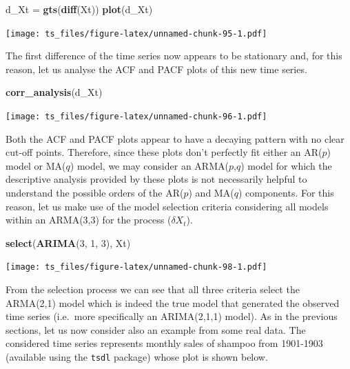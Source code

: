 \documentclass[]{book}
\newenvironment{Shaded}{\begin{snugshade}}{\end{snugshade}}
\newcommand{\KeywordTok}[1]{\textcolor[rgb]{0.13,0.29,0.53}{\textbf{#1}}}
\newcommand{\DecValTok}[1]{\textcolor[rgb]{0.00,0.00,0.81}{#1}}
\newcommand{\StringTok}[1]{\textcolor[rgb]{0.31,0.60,0.02}{#1}}
\newcommand{\NormalTok}[1]{#1}
\theoremstyle{definition}
\theoremstyle{definition}
\theoremstyle{definition}
\theoremstyle{remark}
\begin{document}
\begin{Shaded}
\begin{Highlighting}[]
\NormalTok{d_Xt =}\StringTok{ }\KeywordTok{gts}\NormalTok{(}\KeywordTok{diff}\NormalTok{(Xt))}
\KeywordTok{plot}\NormalTok{(d_Xt)}
\end{Highlighting}
\end{Shaded}

\texttt{[image: ts\_files/figure-latex/unnamed-chunk-95-1.pdf]}

The first difference of the time series now appears to be stationary
and, for this reason, let us analyse the ACF and PACF plots of this new
time series.

\begin{Shaded}
\begin{Highlighting}[]
\KeywordTok{corr_analysis}\NormalTok{(d_Xt)}
\end{Highlighting}
\end{Shaded}

\texttt{[image: ts\_files/figure-latex/unnamed-chunk-96-1.pdf]}

Both the ACF and PACF plots appear to have a decaying pattern with no
clear cut-off points. Therefore, since these plots don't perfectly fit
either an AR(\(p\)) model or MA(\(q\)) model, we may consider an
ARMA(\(p\),\(q\)) model for which the descriptive analysis provided by
these plots is not necessarily helpful to understand the possible orders
of the AR(\(p\)) and MA(\(q\)) components. For this reason, let us make
use of the model selection criteria considering all models within an
ARMA(3,3) for the process (\(\delta X_t\)).

\begin{Shaded}
\begin{Highlighting}[]
\KeywordTok{select}\NormalTok{(}\KeywordTok{ARIMA}\NormalTok{(}\DecValTok{3}\NormalTok{, }\DecValTok{1}\NormalTok{, }\DecValTok{3}\NormalTok{), Xt)}
\end{Highlighting}
\end{Shaded}

\texttt{[image: ts\_files/figure-latex/unnamed-chunk-98-1.pdf]}

From the selection process we can see that all three criteria select the
ARMA(2,1) model which is indeed the true model that generated the
observed time series (i.e.~more specifically an ARIMA(2,1,1) model). As
in the previous sections, let us now consider also an example from some
real data. The considered time series represents monthly sales of
shampoo from 1901-1903 (available using the \texttt{tsdl} package) whose
plot is shown below.
\end{document}
